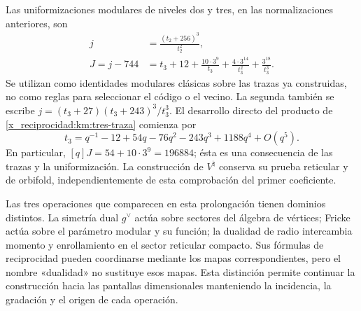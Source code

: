 Las uniformizaciones modulares de niveles dos y tres, en las
normalizaciones anteriores, son
\begin{align}
 j&=\frac{(t_2+256)^3}{t_2^2},
 \label{x_reciprocidad:km:j-nivel2}\\
 J=j-744
 &=t_3+12+\frac{10\cdot3^9}{t_3}
       +\frac{4\cdot3^{14}}{t_3^2}
       +\frac{3^{18}}{t_3^3}.
 \label{x_reciprocidad:km:j-nivel3}
\end{align}
Se utilizan como identidades modulares clásicas sobre las trazas ya
construidas, no como reglas para seleccionar el código o el vecino.
La segunda también se escribe
\(j=(t_3+27)(t_3+243)^3/t_3^3\).
El desarrollo directo del producto de \eqref{x_reciprocidad:km:tres-traza} comienza por
\[
 t_3=q^{-1}-12+54q-76q^2-243q^3+1188q^4+O(q^5).
\]
En particular, \([q]J=54+10\cdot3^9=196884\); ésta es una
consecuencia de las trazas y la uniformización. La construcción de
\(V^\natural\) conserva su prueba reticular y de orbifold,
independientemente de esta comprobación del primer coeficiente.

Las tres operaciones que comparecen en esta prolongación tienen
dominios distintos. La simetría dual \(g^\vee\) actúa sobre sectores
del álgebra de vértices; Fricke actúa sobre el parámetro modular y
su función; la dualidad de radio intercambia momento y enrollamiento
en el sector reticular compacto. Sus fórmulas de reciprocidad pueden
coordinarse mediante los mapas correspondientes, pero el nombre
«dualidad» no sustituye esos mapas. Esta distinción permite continuar
la construcción hacia las pantallas dimensionales manteniendo la
incidencia, la gradación y el origen de cada operación.


